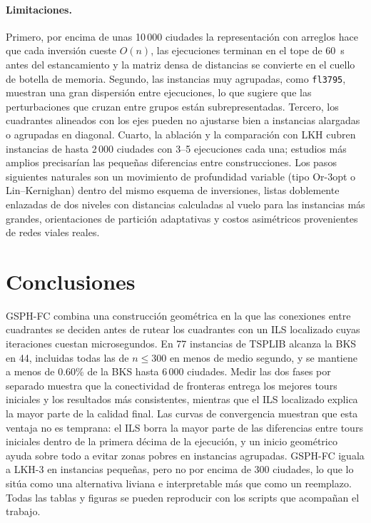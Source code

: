 \documentclass[runningheads]{llncs}
\begin{document}
\paragraph{Limitaciones.} Primero, por encima de unas 10\,000 ciudades
la representación con arreglos hace que cada inversión cueste $O(n)$,
las ejecuciones terminan en el tope de 60~s antes del estancamiento y la
matriz densa de distancias se convierte en el cuello de botella de
memoria. Segundo, las instancias muy agrupadas, como \texttt{fl3795},
muestran una gran dispersión entre ejecuciones, lo que sugiere que las
perturbaciones que cruzan entre grupos están subrepresentadas. Tercero,
los cuadrantes alineados con los ejes pueden no ajustarse bien a
instancias alargadas o agrupadas en diagonal. Cuarto, la ablación y la
comparación con LKH cubren instancias de hasta 2\,000 ciudades con 3--5
ejecuciones cada una; estudios más amplios precisarían las pequeñas
diferencias entre construcciones. Los pasos siguientes naturales son un
movimiento de profundidad variable (tipo Or-3opt o Lin--Kernighan)
dentro del mismo esquema de inversiones, listas doblemente enlazadas de
dos niveles con distancias calculadas al vuelo para las instancias más
grandes, orientaciones de partición adaptativas y costos asimétricos
provenientes de redes viales reales.

\section{Conclusiones}
\label{sec:conclusions}

GSPH-FC combina una construcción geométrica en la que las conexiones
entre cuadrantes se deciden antes de rutear los cuadrantes con un ILS
localizado cuyas iteraciones cuestan microsegundos. En 77 instancias de
TSPLIB alcanza la BKS en 44, incluidas todas las de $n\le 300$ en menos
de medio segundo, y se mantiene a menos de 0.60\% de la BKS hasta 6\,000
ciudades. Medir las dos fases por separado muestra que la conectividad
de fronteras entrega los mejores tours iniciales y los resultados más
consistentes, mientras que el ILS localizado explica la mayor parte de
la calidad final. Las curvas de convergencia muestran que esta ventaja no
es temprana: el ILS borra la mayor parte de las diferencias entre tours
iniciales dentro de la primera décima de la ejecución, y un inicio
geométrico ayuda sobre todo a evitar zonas pobres en instancias
agrupadas. GSPH-FC iguala a LKH-3 en instancias pequeñas, pero no por
encima de 300 ciudades, lo que lo sitúa como una alternativa liviana e
interpretable más que como un reemplazo. Todas las tablas y figuras se
pueden reproducir con los scripts que acompañan el trabajo.
\end{document}
